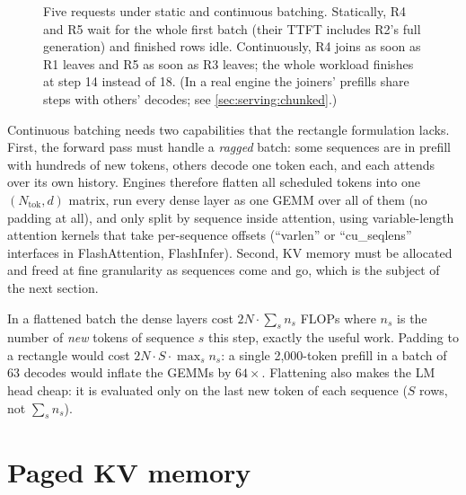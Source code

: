 \begin{figure}[ht]
\caption{Five requests under static and continuous batching. Statically, R4 and R5 wait for the
whole first batch (their TTFT includes R2's full generation) and finished rows idle. Continuously,
R4 joins as soon as R1 leaves and R5 as soon as R3 leaves; the whole workload finishes at step 14
instead of 18. (In a real engine the joiners' prefills share steps with others' decodes; see
\cref{sec:serving:chunked}.)}
\label{fig:serving:timeline}
\end{figure}

Continuous batching needs two capabilities that the rectangle formulation lacks. First, the forward
pass must handle a \emph{ragged} batch: some sequences are in prefill with hundreds of new tokens,
others decode one token each, and each attends over its own history. Engines therefore flatten all
scheduled tokens into one $(N_{\text{tok}},d)$ matrix, run every dense layer as one GEMM over all of
them (no padding at all), and only split by sequence inside attention, using variable-length
attention kernels that take per-sequence offsets (``varlen'' or ``cu\_seqlens'' interfaces in
FlashAttention, FlashInfer). Second, KV memory must be allocated and freed at fine granularity as
sequences come and go, which is the subject of the next section.

\begin{systemslens}
In a flattened batch the dense layers cost $2N\cdot\sum_s n_s$ FLOPs where $n_s$ is the number of
\emph{new} tokens of sequence $s$ this step, exactly the useful work. Padding to a rectangle would cost
$2N\cdot S\cdot\max_s n_s$: a single 2,000-token prefill in a batch of 63 decodes would inflate the
GEMMs by $64\times$. Flattening also makes the LM head cheap: it is evaluated only on the last new
token of each sequence ($S$ rows, not $\sum_s n_s$).
\end{systemslens}

\section{Paged KV memory}\label{sec:serving:paged}

